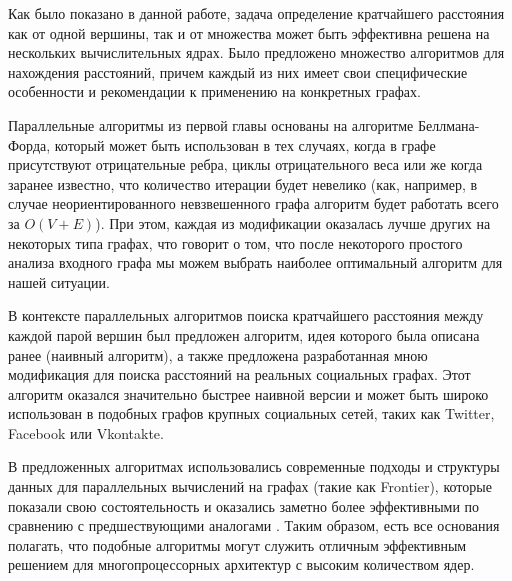\startconclusionpage

Как было показано в данной работе, задача определение кратчайшего расстояния как от одной вершины, так и от множества может быть эффективна решена на нескольких вычислительных ядрах. Было предложено множество алгоритмов для нахождения расстояний, причем каждый из них имеет свои специфические особенности и рекомендации к применению на конкретных графах.

Параллельные алгоритмы из первой главы основаны на алгоритме Беллмана-Форда, который может быть использован в тех случаях, когда в графе присутствуют отрицательные ребра, циклы отрицательного веса или же когда заранее известно, что количество итерации будет невелико (как, например, в случае неориентированного невзвешенного графа алгоритм будет работать всего за $O(V + E)$). При этом, каждая из модификации оказалась лучше других на некоторых типа графах, что говорит о том, что после некоторого простого анализа входного графа мы можем выбрать наиболее оптимальный алгоритм для нашей ситуации.

В контексте параллельных алгоритмов поиска кратчайшего расстояния между каждой парой вершин был предложен алгоритм, идея которого была описана ранее (наивный алгоритм), а также предложена разработанная мною модификация для поиска расстояний на реальных социальных графах. Этот алгоритм оказался значительно быстрее наивной версии и может быть широко использован в подобных графов крупных социальных сетей, таких как Twitter, Facebook или Vkontakte. 

В предложенных алгоритмах использовались современные подходы и структуры данных для параллельных вычислений на графах (такие как Frontier), которые показали свою состоятельность и оказались заметно более эффективными по сравнению с предшествующими аналогами \cite{LIGRA}. Таким образом, есть все основания полагать, что подобные алгоритмы могут служить отличным эффективным решением для многопроцессорных архитектур с высоким количеством ядер.  

\FloatBarrier
